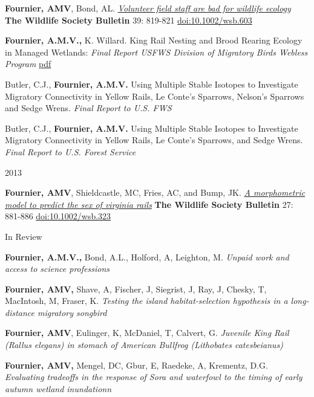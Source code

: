 \documentclass[]{article}
\begin{document}
\textbf{Fournier, AMV}, Bond, AL.
\href{https://github.com/aurielfournier/aurielfournier.github.io/blob/master/_pdfs/Fournier\%2C\%20Bond\%20-\%202015\%20-\%20Wildlife\%20Society\%20Bulletin.pdf}{\emph{Volunteer
field staff are bad for wildlife ecology}} \textbf{The Wildlife Society
Bulletin} 39: 819-821 \url{doi:10.1002/wsb.603}

\textbf{Fournier, A.M.V.,} K. Willard. King Rail Nesting and Brood
Rearing Ecology in Managed Wetlands: \emph{Final Report USFWS Division
of Migratory Birds Webless Program}
\href{https://www.fws.gov/migratorybirds/pdf/surveys-and-data/Webless\%20Migratory\%20Game\%20Birds/Marsh\%20Bird\%20pdf\%20files/KingRailNesting\&BroodRearingEcologyInManagedWetlands_FinalReport.pdf}{pdf}

Butler, C.J., \textbf{Fournier, A.M.V.} Using Multiple Stable Isotopes
to Investigate Migratory Connectivity in Yellow Rails, Le Conte's
Sparrows, Nelson's Sparrows and Sedge Wrens. \emph{Final Report to U.S.
FWS}

Butler, C.J., \textbf{Fournier, A.M.V.} Using Multiple Stable Isotopes
to Investigate Migratory Connectivity in Yellow Rails, Le Conte's
Sparrows, and Sedge Wrens. \emph{Final Report to U.S. Forest Service}

2013

\textbf{Fournier, AMV}, Shieldcastle, MC, Fries, AC, and Bump, JK.
\href{https://github.com/aurielfournier/aurielfournier.github.io/blob/master/_pdfs/Fournier\%20et\%20al._2013_Wildlife\%20Society\%20Bulletin_A\%20Morphometric\%20Model\%20to\%20Predict\%20the\%20Sex\%20of\%20Virginia\%20Rails\%20(Rallus\%20limicola).pdf}{\emph{A
morphometric model to predict the sex of virginia rails}} \textbf{The
Wildlife Society Bulletin} 27: 881-886 \url{doi:10.1002/wsb.323}

In Review

\textbf{Fournier, A.M.V.,} Bond, A.L., Holford, A, Leighton, M.
\emph{Unpaid work and access to science professions}

\textbf{Fournier, AMV,} Shave, A, Fischer, J, Siegrist, J, Ray, J,
Chesky, T, MacIntosh, M, Fraser, K. \emph{Testing the island
habitat-selection hypothesis in a long-distance migratory songbird}

\textbf{Fournier, AMV}, Eulinger, K, McDaniel, T, Calvert, G.
\emph{Juvenile King Rail (Rallus elegans) in stomach of American
Bullfrog (Lithobates catesbeianus)}

\textbf{Fournier, AMV,} Mengel, DC, Gbur, E, Raedeke, A, Krementz, D.G.
\emph{Evaluating tradeoffs in the response of Sora and waterfowl to the
timing of early autumn wetland inundationn}
\end{document}
